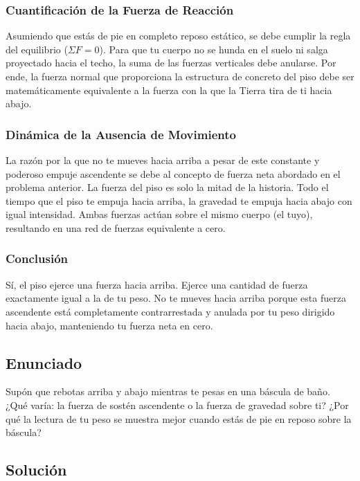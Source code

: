 \documentclass[12pt,letterpaper]{article}
\begin{document}
\subsubsection*{Cuantificación de la Fuerza de Reacción}
Asumiendo que estás de pie en completo reposo estático, se debe cumplir la regla del equilibrio ($\Sigma F = 0$). Para que tu cuerpo no se hunda en el suelo ni salga proyectado hacia el techo, la suma de las fuerzas verticales debe anularse. Por ende, la fuerza normal que proporciona la estructura de concreto del piso debe ser matemáticamente equivalente a la fuerza con la que la Tierra tira de ti hacia abajo.

\subsubsection*{Dinámica de la Ausencia de Movimiento}
La razón por la que no te mueves hacia arriba a pesar de este constante y poderoso empuje ascendente se debe al concepto de fuerza neta abordado en el problema anterior. La fuerza del piso es solo la mitad de la historia. Todo el tiempo que el piso te empuja hacia arriba, la gravedad te empuja hacia abajo con igual intensidad. Ambas fuerzas actúan sobre el mismo cuerpo (el tuyo), resultando en una red de fuerzas equivalente a cero.

\subsubsection*{Conclusión}
Sí, el piso ejerce una fuerza hacia arriba. Ejerce una cantidad de fuerza exactamente igual a la de tu peso. No te mueves hacia arriba porque esta fuerza ascendente está completamente contrarrestada y anulada por tu peso dirigido hacia abajo, manteniendo tu fuerza neta en cero.

\newpage

\subsection*{Enunciado}
Supón que rebotas arriba y abajo mientras te pesas en una báscula de baño. ¿Qué varía: la fuerza de sostén ascendente o la fuerza de gravedad sobre ti? ¿Por qué la lectura de tu peso se muestra mejor cuando estás de pie en reposo sobre la báscula?

\subsection*{Solución}
\end{document}
